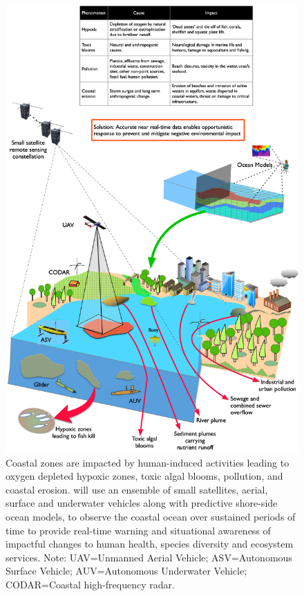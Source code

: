 \begin{figure}[h!]
  \centering
  \includegraphics[scale=0.1]{fig/mega-cities-toxic-1.jpg}
  \caption{Coastal zones are impacted by human-induced activities
    leading to oxygen depleted hypoxic zones, toxic algal blooms,
    pollution, and coastal erosion. \pro will use an ensemble of small
    satellites, aerial, surface and underwater vehicles along with
    predictive shore-side ocean models, to observe the coastal ocean
    over sustained periods of time to provide real-time warning and
    situational awareness of impactful changes to human health,
    species diversity and ecosystem services. Note: UAV=Unmanned
    Aerial Vehicle; ASV=Autonomous Surface Vehicle; AUV=Autonomous
    Underwater Vehicle; CODAR=Coastal high-frequency radar.}
    \label{fig:mega-cities}
\end{figure}

